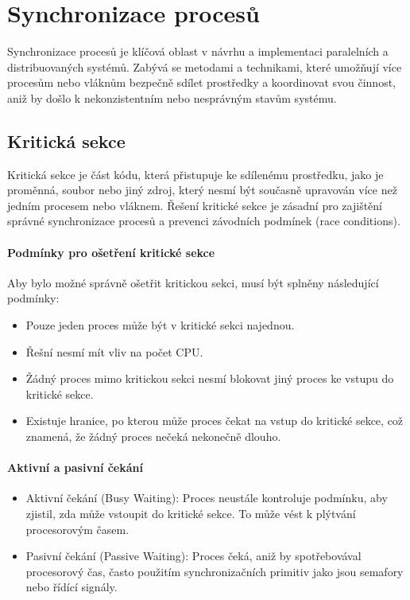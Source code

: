\section{Synchronizace procesů}

Synchronizace procesů je klíčová oblast v návrhu a implementaci paralelních a distribuovaných systémů. Zabývá se metodami a technikami, které umožňují více procesům nebo vláknům bezpečně sdílet prostředky a koordinovat svou činnost, aniž by došlo k nekonzistentním nebo nesprávným stavům systému.

\subsection{Kritická sekce}
Kritická sekce je část kódu, která přistupuje ke sdílenému prostředku, jako je proměnná, soubor nebo jiný zdroj, který nesmí být současně upravován více než jedním procesem nebo vláknem. Řešení kritické sekce je zásadní pro zajištění správné synchronizace procesů a prevenci závodních podmínek (race conditions).

\paragraph{Podmínky pro ošetření kritické sekce}

Aby bylo možné správně ošetřit kritickou sekci, musí být splněny následující podmínky:
\begin{itemize}
    \item Pouze jeden proces může být v kritické sekci najednou.
    \item Řešní nesmí mít vliv na počet CPU.
    \item Žádný proces mimo kritickou sekci nesmí blokovat jiný proces ke vstupu do kritické sekce.
    \item Existuje hranice, po kterou může proces čekat na vstup do kritické sekce, což znamená, že žádný proces nečeká nekonečně dlouho.
\end{itemize}

\paragraph{Aktivní a pasivní čekání}
\begin{itemize}
    \item Aktivní čekání (Busy Waiting): Proces neustále kontroluje podmínku, aby zjistil, zda může vstoupit do kritické sekce. To může vést k plýtvání procesorovým časem.
    \item Pasivní čekání (Passive Waiting): Proces čeká, aniž by spotřebovával procesorový čas, často použitím synchronizačních primitiv jako jsou semafory nebo řídící signály.
\end{itemize}
